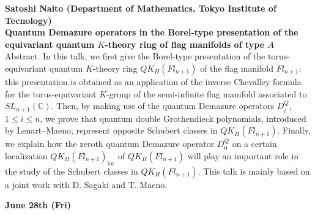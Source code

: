 \documentclass[12pt,landscape]{jarticle}
\begin{document}
%
{\bf\large Satoshi Naito (Department of Mathematics, Tokyo Institute of Tecnology)} \\ 
{\bf Quantum Demazure operators in the Borel-type presentation of the equivariant quantum $K$-theory ring of flag manifolds of type $A$} \\[1mm]
Abstract. 
In this talk, 
we first give the Borel-type presentation of the 
torus-equivariant quantum $K$-theory ring 
$QK_H(Fl_{n+1})$ of the flag manifold $Fl_{n+1}$; 
this presentation is obtained as an application of 
the inverse Chevalley formula for the 
torus-equivariant $K$-group of the 
semi-infinite flag manifold associated to 
$SL_{n+1}(\mathbb{C})$. 
Then, by making use of the quantum Demazure operators 
$D_i^Q$, 
$1 \leq i \leq n$, 
we prove that quantum double Grothendieck polynomials, 
introduced by Lenart--Maeno, 
represent opposite Schubert classes in 
$QK_H(Fl_{n+1})$. 
Finally, we explain how the zeroth quantum Demazure operator $D_0^Q$ 
on a certain localization $QK_H(Fl_{n+1})_{\mathrm{loc}}$ of 
$QK_H(Fl_{n+1})$ will play an important role 
in the study of the Schubert classes in $QK_H(Fl_{n+1})$. 
This talk is mainly based on a joint work with D. Sagaki and T. Maeno.
\\
\hrulefill


\begin{center}
{\bf\Large June 28th (Fri)}
\end{center}
\end{document}
